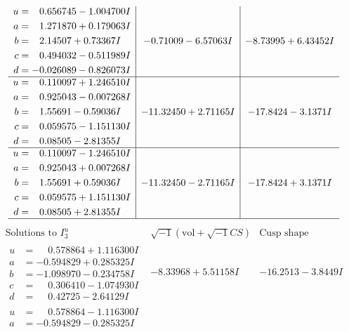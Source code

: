 \documentclass[1p]{elsarticle_modified}
\theoremstyle{definition}
\newcommand{\I}{\sqrt{-1}}
\begin{document}
$$\begin{array}{c|c|c}
\begin{aligned}
u &= \phantom{-}0.656745 - 1.004700 I \\
a &= \phantom{-}1.271870 + 0.179063 I \\
b &= \phantom{-}2.14507 + 0.73367 I \\
c &= \phantom{-}0.494032 - 0.511989 I \\
d &= -0.026089 - 0.826073 I\end{aligned}
 & -0.71009 - 6.57063 I & -8.73995 + 6.43452 I \\ \hline\begin{aligned}
u &= \phantom{-}0.110097 + 1.246510 I \\
a &= \phantom{-}0.925043 - 0.007268 I \\
b &= \phantom{-}1.55691 - 0.59036 I \\
c &= \phantom{-}0.059575 - 1.151130 I \\
d &= \phantom{-}0.08505 - 2.81355 I\end{aligned}
 & -11.32450 + 2.71165 I & -17.8424 - 3.1371 I \\ \hline\begin{aligned}
u &= \phantom{-}0.110097 - 1.246510 I \\
a &= \phantom{-}0.925043 + 0.007268 I \\
b &= \phantom{-}1.55691 + 0.59036 I \\
c &= \phantom{-}0.059575 + 1.151130 I \\
d &= \phantom{-}0.08505 + 2.81355 I\end{aligned}
 & -11.32450 - 2.71165 I & -17.8424 + 3.1371 I\\
 \hline 
 \end{array}$$\newpage$$\begin{array}{c|c|c}  
\text{Solutions to }I^u_{3}& \I (\text{vol} + \sqrt{-1}CS) & \text{Cusp shape}\\
 \hline 
\begin{aligned}
u &= \phantom{-}0.578864 + 1.116300 I \\
a &= -0.594829 + 0.285325 I \\
b &= -1.098970 - 0.234758 I \\
c &= \phantom{-}0.306410 - 1.074930 I \\
d &= \phantom{-}0.42725 - 2.64129 I\end{aligned}
 & -8.33968 + 5.51158 I & -16.2513 - 3.8449 I \\ \hline\begin{aligned}
u &= \phantom{-}0.578864 - 1.116300 I \\
a &= -0.594829 - 0.285325 I \\

\end{aligned}
\end{array}$$
\end{document}
